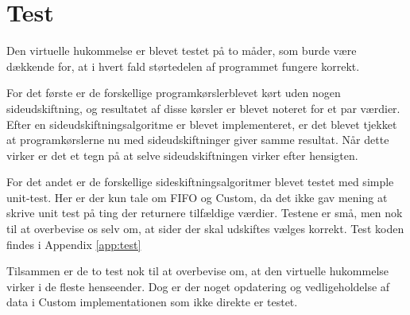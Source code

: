\section{Test}
Den virtuelle hukommelse er blevet testet på to måder, som burde være dækkende for, at i hvert fald størtedelen af programmet fungere korrekt.

For det første er de forskellige programkørslerblevet kørt uden nogen sideudskiftning, og resultatet af disse kørsler er blevet noteret for et par værdier. Efter en sideudskiftningsalgoritme er blevet implementeret, er det blevet tjekket at programkørslerne nu med sideudskiftninger giver samme resultat. Når dette virker er det et tegn på at selve sideudskiftningen virker efter hensigten.

For det andet er de forskellige sideskiftningsalgoritmer blevet testet med simple unit-test. Her er der kun tale om FIFO og Custom, da det ikke gav mening at skrive unit test på ting der returnere tilfældige værdier. Testene er små, men nok til at overbevise os selv om, at sider der skal udskiftes vælges korrekt. Test koden findes i Appendix \ref{app:test}

Tilsammen er de to test nok til at overbevise om, at den virtuelle hukommelse virker i de fleste henseender. Dog er der noget opdatering og vedligeholdelse af data i Custom implementationen som ikke direkte er testet.
